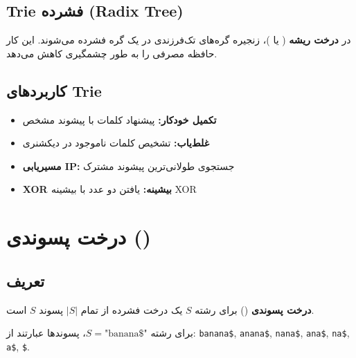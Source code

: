 \documentclass{matinbook}
\begin{document}
    \subsection{Trie فشرده (Radix Tree)}
    
    \begin{definition}
        در \textbf{درخت ریشه}
        ( یا )،
        زنجیره گره‌های تک‌فرزندی
        در یک گره فشرده می‌شوند.
        این کار حافظه مصرفی را
        به طور چشمگیری کاهش می‌دهد.
        \label{def:radix-tree}
    \end{definition}
    
    \subsection{کاربردهای Trie}
    
    \begin{itemize}
        \item \textbf{تکمیل خودکار:}
        پیشنهاد کلمات با پیشوند مشخص
        \item \textbf{غلط‌یاب:}
        تشخیص کلمات ناموجود در دیکشنری
        \item \textbf{مسیریابی IP:}
        جستجوی طولانی‌ترین پیشوند مشترک
        \item \textbf{XOR بیشینه:}
        یافتن دو عدد با بیشینه XOR
    \end{itemize}
    
    \section{درخت پسوندی ()}
    
    \subsection{تعریف}
    
    \begin{definition}
        \textbf{درخت پسوندی}
        () برای رشته $S$
        یک درخت فشرده از تمام
        $|S|$ پسوند $S$ است.
        \label{def:suffix-tree}
    \end{definition}
    
    برای رشته $S = \text{"banana\$"}$،
    پسوندها عبارتند از: \texttt{banana\$},
    \texttt{anana\$}, \texttt{nana\$},
    \texttt{ana\$}, \texttt{na\$}, \texttt{a\$}, \texttt{\$}.
    
\end{document}
